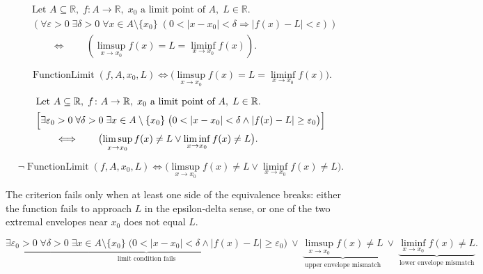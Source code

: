 \begin{remark*}
\[
\begin{aligned}
&\text{Let } A \subseteq \mathbb{R},\; f \colon A \to \mathbb{R},\; x_0 \text{ a limit point of } A,\; L \in \mathbb{R}.\\
&\left(\forall \varepsilon > 0\; \exists \delta > 0\; \forall x \in A \setminus \{x_0\}\;
  (0 < |x - x_0| < \delta \Rightarrow |f(x) - L| < \varepsilon)\right)\\
&\qquad\Longleftrightarrow\qquad
\left(\limsup_{x \to x_0} f(x) = L = \liminf_{x \to x_0} f(x)\right).
\end{aligned}
\]
\end{remark*}

\begin{remark*}
\[
\operatorname{FunctionLimit}(f, A, x_0, L)
\Longleftrightarrow
\bigl(\limsup_{x \to x_0} f(x) = L = \liminf_{x \to x_0} f(x)\bigr).
\]
\end{remark*}

\begin{remark*}
\[
\begin{aligned}
&\text{Let } A \subseteq \mathbb{R},\; f \colon A \to \mathbb{R},\; x_0 \text{ a limit point of } A,\; L \in \mathbb{R}.\\
&\Bigl[\exists \varepsilon_0>0\;\forall \delta>0\;\exists x\in A\setminus\{x_0\}\;
\bigl(0<|x-x_0|<\delta\land |f(x)-L|\ge\varepsilon_0\bigr)\Bigr]\\
&\qquad\Longleftrightarrow\qquad
\bigl(\limsup_{x\to x_0} f(x)\ne L \lor \liminf_{x\to x_0} f(x)\ne L\bigr).
\end{aligned}
\]
\end{remark*}

\begin{remark*}
\[
\neg\operatorname{FunctionLimit}(f,A,x_0,L)
\Longleftrightarrow
\bigl(\limsup_{x\to x_0} f(x)\ne L \lor \liminf_{x\to x_0} f(x)\ne L\bigr).
\]
\end{remark*}

\begin{remark*}
The criterion fails only when at least one side of the equivalence breaks:
either the function fails to approach $L$ in the epsilon-delta sense, or
one of the two extremal envelopes near $x_0$ does not equal $L$.
\end{remark*}

\begin{remark*}
\[
\underbrace{\exists \varepsilon_0>0\;\forall \delta>0\;\exists x\in A\setminus\{x_0\}\;
\bigl(0<|x-x_0|<\delta\land |f(x)-L|\ge\varepsilon_0\bigr)}_{\text{limit condition fails}}
\ \lor\
\underbrace{\limsup_{x\to x_0} f(x)\ne L}_{\text{upper envelope mismatch}}
\ \lor\
\underbrace{\liminf_{x\to x_0} f(x)\ne L}_{\text{lower envelope mismatch}}.
\]
\end{remark*}

